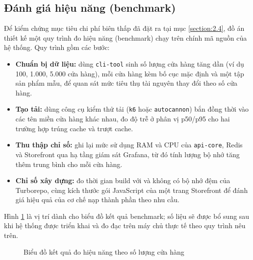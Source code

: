 \documentclass[../main.tex]{subfiles}
\begin{document}
\subsection{Đánh giá hiệu năng (benchmark)}
\label{subsection:4.5.1}

Để kiểm chứng mục tiêu chi phí biên thấp đã đặt ra tại mục \ref{section:2.4}, đồ án thiết kế một quy trình đo hiệu năng (benchmark) chạy trên chính mã nguồn của hệ thống. Quy trình gồm các bước:

\begin{itemize}
    \item \textbf{Chuẩn bị dữ liệu:} dùng \texttt{cli-tool} sinh số lượng cửa hàng tăng dần (ví dụ 100, 1.000, 5.000 cửa hàng), mỗi cửa hàng kèm bố cục mặc định và một tập sản phẩm mẫu, để quan sát mức tiêu thụ tài nguyên thay đổi theo số cửa hàng.
    \item \textbf{Tạo tải:} dùng công cụ kiểm thử tải (\texttt{k6} hoặc \texttt{autocannon}) bắn đồng thời vào các tên miền cửa hàng khác nhau, đo độ trễ ở phân vị p50/p95 cho hai trường hợp trúng cache và trượt cache.
    \item \textbf{Thu thập chỉ số:} ghi lại mức sử dụng RAM và CPU của \texttt{api-core}, Redis và Storefront qua hạ tầng giám sát Grafana, từ đó tính lượng bộ nhớ tăng thêm trung bình cho mỗi cửa hàng.
    \item \textbf{Chỉ số xây dựng:} đo thời gian build với và không có bộ nhớ đệm của Turborepo, cùng kích thước gói JavaScript của một trang Storefront để đánh giá hiệu quả của cơ chế nạp thành phần theo nhu cầu.
\end{itemize}

Hình \ref{fig:benchmark} là vị trí dành cho biểu đồ kết quả benchmark; số liệu sẽ được bổ sung sau khi hệ thống được triển khai và đo đạc trên máy chủ thực tế theo quy trình nêu trên.

\begin{figure}[H]
    \centering
    \caption{Biểu đồ kết quả đo hiệu năng theo số lượng cửa hàng}
    \label{fig:benchmark}
\end{figure}
\end{document}
